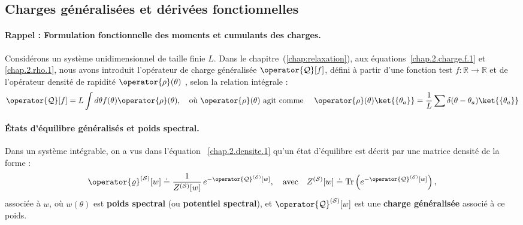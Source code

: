 \subsection{Charges généralisées et dérivées fonctionnelles}


\begin{mdframed}[
	linewidth=0.5pt, 
	backgroundcolor=gray!5, 
	roundcorner=50pt,	
	innerleftmargin=5pt,
    innerrightmargin=5pt,
    innertopmargin=-10pt,
    innerbottommargin=2pt,
    leftmargin=2pt,
    rightmargin=2pt
	]
\paragraph{Rappel : Formulation fonctionnelle des moments et cumulants des charges.}
Considérons un système unidimensionnel de taille finie $L$. 
Dans le chapitre~(\ref{chap:relaxation}), aux équations~\eqref{chap.2.charge.f.1} et \eqref{chap.2.rho.1}, nous avons introduit l’opérateur de charge généralisée $\operator{\mathcal{Q}}[f]$, défini à partir d'une fonction test $f \colon \mathbb{R} \to \mathbb{R}$ et de l'opérateur densité de rapidité  $\operator{\rho}(\theta)$ , selon la relation intégrale :
\begin{eqnarray}\label{chap4:eq.charge.q.1}
	\operator{\mathcal{Q}}[f] = L\int d\theta f(\theta) \operator{\rho}(\theta),\quad \text{où $\operator{\rho}(\theta)$ agit comme } \quad \operator{\rho}(\theta) \ket{ \{ \theta_a \} } = \frac{1}{L} \sum \delta ( \theta - \theta_a ) \ket{ \{ \theta_a \} }
\end{eqnarray}

\paragraph{États d'équilibre généralisés et poids spectral.}
Dans un système intégrable, on a vus dans l'équation ~\eqref{chap.2.densite.1} qu'un état d’équilibre est décrit par une matrice densité de la forme :
\begin{eqnarray}
	\operator{\varrho}^{(\mathcal{S})}[w] \doteq  \frac{1}{Z^{(\mathcal{S})}[w]}\, e^{-\operator{\mathcal{Q}}^{(\mathcal{S})}[w]},\quad \text{avec} \quad Z^{(\mathcal{S})}[w] \doteq \mathrm{Tr}\left(e^{-\operator{\mathcal{Q}}^{(\mathcal{S})}[w]}\right),
\end{eqnarray}
associée à $w$, où \( w(\theta) \) est {\bf poids spectral} (ou {\bf potentiel spectral}), et   \( \operator{\mathcal{Q}}^{(\mathcal{S})}[w] \) est une {\bf charge généralisée} associé à ce poids.
\end{mdframed}

